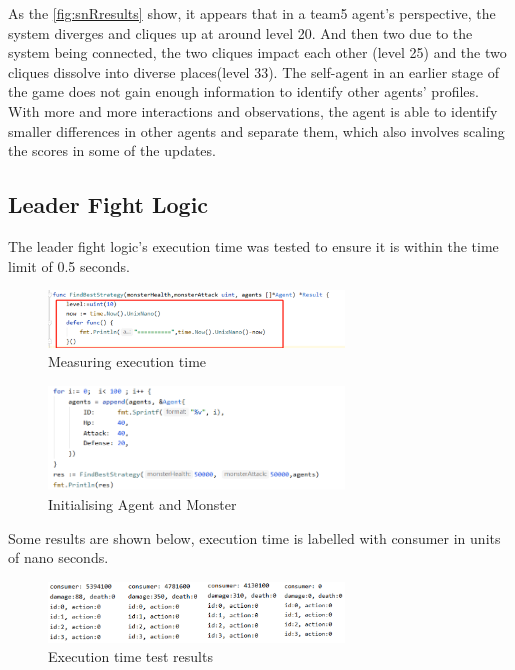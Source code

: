 As the \ref{fig:snRresults} show, it appears that in a team5 agent's perspective, the system diverges and cliques up at around level 20. And then two due to the system being connected, the two cliques impact each other (level 25) and the two cliques dissolve into diverse places(level 33). The self-agent in an earlier stage of the game does not gain enough information to identify other agents' profiles. With more and more interactions and observations, the agent is able to identify smaller differences in other agents and separate them, which also involves scaling the scores in some of the updates.

\subsection{Leader Fight Logic}
The leader fight logic's execution time was tested to ensure it is within the time limit of 0.5 seconds.

\begin{figure}[htb]
    \centering
    \includegraphics[width=0.7\textwidth]{008_team_5_agent_design/images/10.png}
    \caption{Measuring execution time}
    \label{testingexecutiontime}
\end{figure}

\begin{figure}[!ht]
    \centering
    \includegraphics[width=0.7\textwidth]{008_team_5_agent_design/images/11.png}
    \caption{Initialising Agent and Monster}
    \label{initialisingagentandmonster}
\end{figure}

Some results are shown below, execution time is labelled with consumer in units of nano seconds.

\begin{figure}[!ht]
    \centering
    \includegraphics[width=0.7\textwidth]{008_team_5_agent_design/images/12.png}
    \caption{Execution time test results}
    \label{executiontimetestresults}
\end{figure}

